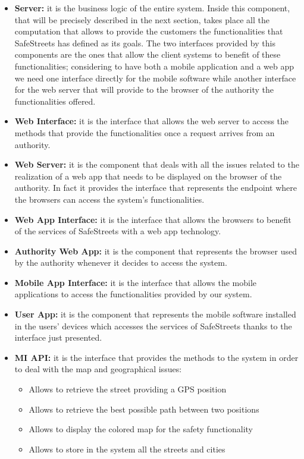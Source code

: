 		\begin{itemize}
			\item \textbf{Server:} it is the business logic of the entire system. Inside this component, that will be precisely described in the next section, takes place all the computation that allows to provide the customers the functionalities that SafeStreets has defined as its goals. The two interfaces provided by this components are the ones that allow the client systems to benefit of these functionalities; considering to have both a mobile application and a web app we need one interface directly for the mobile software while another interface for the web server that will provide to the browser of the authority the functionalities offered.
			
			\item \textbf{Web Interface:} it is the interface that allows the web server to access the methods that provide the functionalities once a request arrives from an authority.
			
			\item \textbf{Web Server:} it is the component that deals with all the issues related to the realization of a web app that needs to be displayed on the browser of the authority. In fact it provides the interface that  represents the endpoint where the browsers can access the system's functionalities.
			
			\item \textbf{Web App Interface:} it is the interface that allows the browsers to benefit of the services of SafeStreets with a web app technology.
			
			\item \textbf{Authority Web App:} it is the component that represents the browser used by the authority whenever it decides to access the system.
			
			\item \textbf{Mobile App Interface:} it is the interface that allows the mobile applications to access the functionalities provided by our system.
			
			\item \textbf{User App:} it is the component that represents the mobile software installed in the users' devices which accesses the services of SafeStreets thanks to the interface just presented.
			
			\item \textbf{MI API:} it is the interface that provides the methods to the system in order to deal with the map and geographical issues:
				\begin{itemize}
					\item Allows to retrieve the street providing a GPS position
					\item Allows to retrieve the best possible path between two positions
					\item Allows to display the colored map for the safety functionality
					\item Allows to store in the system all the streets and cities
				\end{itemize}
			

\end{itemize}
